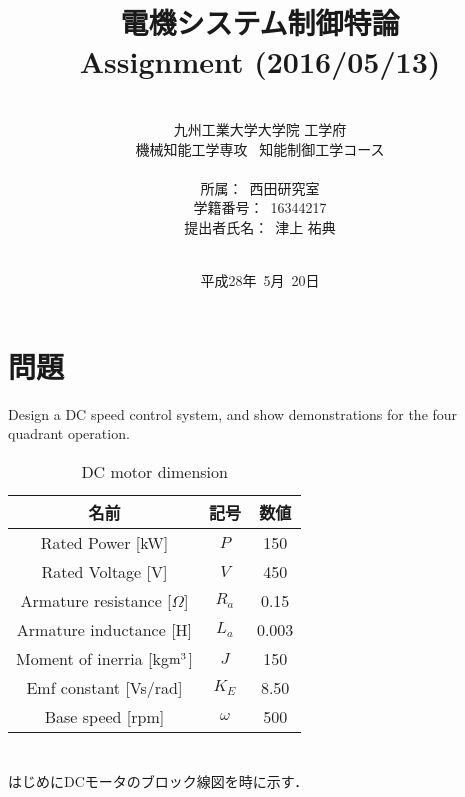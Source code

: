 \documentclass[a4paper,12pt]{jarticle}
\title{電機システム制御特論 \\
Assignment (2016/05/13)\\
}
\author{\vspace{40mm}\\
九州工業大学大学院 \hspace{0mm} 工学府\\
機械知能工学専攻\ \hspace{0mm} 知能制御工学コース \\
\vspace{5mm}\\
所属：\ 西田研究室\\
学籍番号：\ 16344217\\
提出者氏名：\ 津上 \hspace{0mm} 祐典\\\vspace{5mm}\\ }
\date{平成28年\ 5月\ 20日}
\begin{document}
\titlepage
\maketitle
\thispagestyle{empty}

\newpage

\section*{問題}
Design a DC speed control system, and show demonstrations for the four quadrant operation.
%
\begin{table}[h]
 \centering
 \caption{DC motor dimension}
 \label{table:DC_dim}
 \begin{tabular}{c|c|c} \hline
  名前& 記号& 数値\\\hline
  Rated Power [kW]              &$P$&150  \\\hline
  Rated Voltage [V]             &$V$&450  \\\hline
  Armature resistance [$\Omega$]&$R_a$& 0.15 \\\hline
  Armature inductance [H]       &$L_a$&0.003\\\hline
  Moment of inerria [kg$\rm {m^3}$] &$J$&150  \\\hline
  Emf constant [Vs/rad]       &$K_E$&8.50 \\\hline
  Base speed [rpm]            &$\omega$&500  \\\hline
 \end{tabular}
\end{table}
%
\section{}
はじめにDCモータのブロック線図を時に示す．
\end{document}
